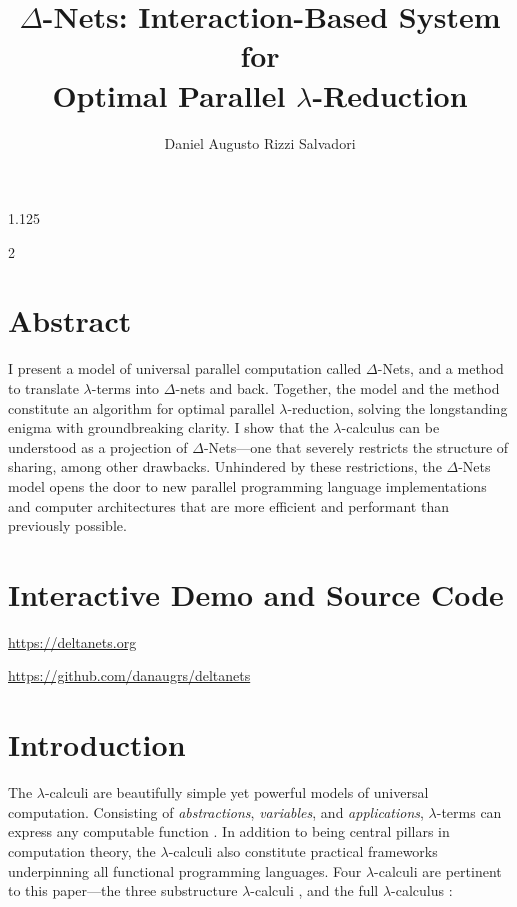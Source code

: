 \documentclass[10pt]{article}
\begin{document}
\begin{spacing}{1.125}

\title{\vspace{-1.125cm}\bf{\mbox{$\Delta$-Nets}: Interaction-Based System for\\Optimal Parallel \mbox{$\lambda$-Reduction}}}
\author{Daniel Augusto Rizzi Salvadori}
\date{\vspace{12pt}}
\maketitle

\begin{multicols}{2}

\section*{Abstract}

I present a model of universal parallel computation called \mbox{$\Delta$-Nets}, and a method to translate \mbox{$\lambda$-terms} into \mbox{$\Delta$-nets} and back.
Together, the model and the method constitute an algorithm for optimal parallel \mbox{$\lambda$-reduction}, solving the longstanding enigma with groundbreaking clarity.
I show that the \mbox{$\lambda$-calculus} can be understood as a projection of \mbox{$\Delta$-Nets}---one that severely restricts the structure of sharing, among other drawbacks.
Unhindered by these restrictions, the \mbox{$\Delta$-Nets} model opens the door to new parallel programming language implementations and computer architectures that are more efficient and performant than previously possible.

\section*{Interactive Demo and Source Code}

\url{https://deltanets.org}

\url{https://github.com/danaugrs/deltanets}

\section{Introduction}

The \mbox{$\lambda$-calculi} are beautifully simple yet powerful models of universal computation. Consisting of \textit{abstractions}, \textit{variables}, and \textit{applications}, \mbox{$\lambda$-terms} can express any computable function \cite{Chu36, Tur36, Tur37, Chu41}. In addition to being central pillars in computation theory, the \mbox{$\lambda$-calculi} also constitute practical frameworks underpinning all functional programming languages.
Four \mbox{$\lambda$-calculi} are pertinent to this paper---the three substructure \mbox{$\lambda$-calculi} \cite{Jac93}, and the full \mbox{$\lambda$-calculus} \cite{Bar84}:


\end{multicols}
\end{spacing}
\end{document}

